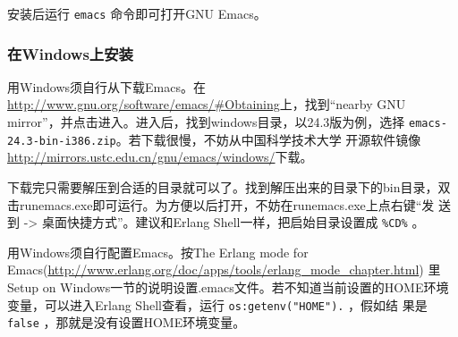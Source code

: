 \documentclass[preview,multi,crop=false,border=1in,class=memoir]{standalone}
\begin{document}
\begin{preview-page}
安装后运行 \verb|emacs| 命令即可打开GNU Emacs。

\subsubsection{在Windows上安装}

用Windows须自行从下载Emacs。在
\url{http://www.gnu.org/software/emacs/#Obtaining}上，找到``nearby GNU
mirror''，并点击进入。进入后，找到windows目录，以24.3版为例，选择
\verb|emacs-24.3-bin-i386.zip|。若下载很慢，不妨从中国科学技术大学
开源软件镜像\url{http://mirrors.ustc.edu.cn/gnu/emacs/windows/}下载。

\nonzeroparskip

下载完只需要解压到合适的目录就可以了。找到解压出来的目录下的bin目录，双
击runemacs.exe即可运行。为方便以后打开，不妨在runemacs.exe上点右键``发
送到 -> 桌面快捷方式''。建议和Erlang Shell一样，把启始目录设置成
\verb|%CD%| 。

\nonzeroparskip

用Windows须自行配置Emacs。按The Erlang mode for
Emacs(\url{http://www.erlang.org/doc/apps/tools/erlang_mode_chapter.html})
里Setup on Windows一节的说明设置.emacs文件。若不知道当前设置的HOME环境
变量，可以进入Erlang Shell查看，运行 \verb|os:getenv("HOME").| ，假如结
果是 \verb|false| ，那就是没有设置HOME环境变量。


\end{preview-page}
\end{document}

